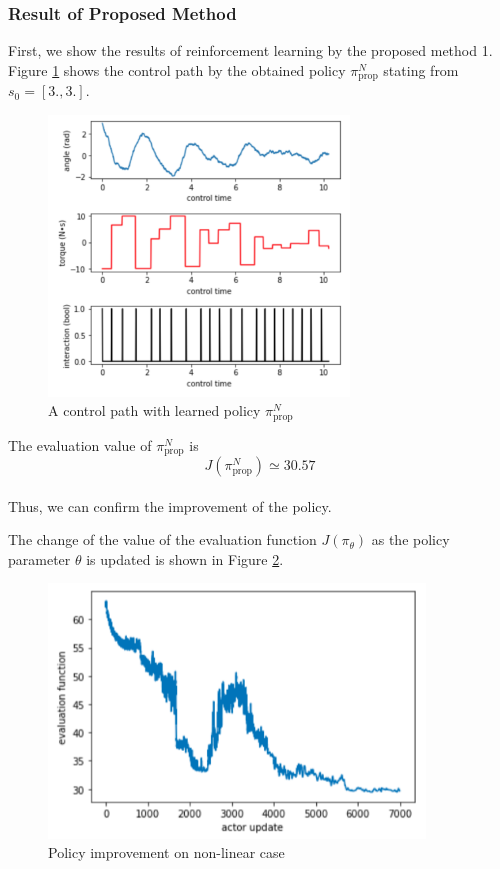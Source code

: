 \documentclass[english, dvipdfmx]{ampmt}             %
\begin{document}
\subsubsection{Result of Proposed Method}
First, we show the results of reinforcement learning by the proposed method 1. Figure \ref{proposed_1_nl} shows the control path by the obtained policy $\pi_{\textrm{prop}}^N$ stating from $s_0 = [3., 3.]$.
\begin{figure}[t]
	\centering
 	\includegraphics[width=8cm]{proposed_1_nl.png}
 	\caption{A control path with learned policy $\pi_{\textrm{prop}}^N$} \label{proposed_1_nl}
\end{figure}
The evaluation value of $\pi_{\textrm{prop}}^N$ is
\begin{equation}
	J(\pi_{\textrm{prop}}^N) \simeq 30.57
\end{equation}\\
Thus, we can confirm the improvement of the policy.\par
The change of the value of the evaluation function $J( \pi_{\theta})$ as the policy parameter $\theta$ is updated is shown in Figure \ref{evaluation_log_nl}.
\begin{figure}[H]
	\centering
 	\includegraphics[width=10cm]{evaluation_log_nl.png}
 	\caption{Policy improvement on non-linear case} \label{evaluation_log_nl}
\end{figure}
\end{document}
